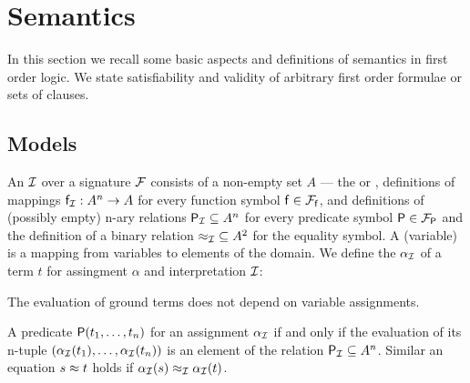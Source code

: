 











\section{Semantics}\label{sec:semantics}

In this section we recall some basic aspects and definitions of semantics in first order logic.
We state satisfiability and validity of arbitrary first order formulae or sets of clauses.

\subsection{Models}

\begin{definition}\label{def:interpretation}
	An  \( \mathcal{I} \) over a signature \( \mathcal{F} \) consists of a
	non-empty set \( A \) --- the  or ,
	definitions of mappings \( \mathsf{f}_{\mathcal{I}}: A^n\rightarrow A \) for every function symbol \( \mathsf{f}\in{\mathcal{F}_{\mathsf{f}}} \),
	and definitions of (possibly empty) n-ary relations
	 \( {\mathsf{P}_{\mathcal{I}}}\subseteq A^n \) for every predicate symbol \( \mathsf{P}\in{\mathcal{F}_{\mathsf{P}}} \)
	 and the definition of a binary relation \( {\approx_{\mathcal{I}}}\subseteq A^2 \) for the equality symbol.
	 A (variable)  is a mapping from variables to elements of the domain.
	 We define the  \( \alpha_{\mathcal{I}} \) of a term \( t \)
	 for assingment \( \alpha \) and interpretation \( \mathcal{I} \):
\begin{remark}
	The evaluation of ground terms does not depend on variable assignments.
\end{remark}
\end{definition}

\begin{definition}\label{def:semantics:atoms}
	A predicate \( \mathsf{P}(t_1,\ldots,t_n) \)
	 for an assignment \( \alpha_{\mathcal{I}} \)
	if and only if the evaluation of its n-tuple \(
	(\alpha_{\mathcal{I}}({t_1}),\ldots,\alpha_{\mathcal{I}}({t_n})) \)
	is an element of the relation \( \mathsf{P}_{\mathcal{I}}\subseteq A^n \).
	Similar an equation \( s\approx t \)
	holds if \( \alpha_{\mathcal{I}}(s) \approx_{\mathcal{I}} \alpha_{\mathcal{I}}(t) \).
\end{definition}

